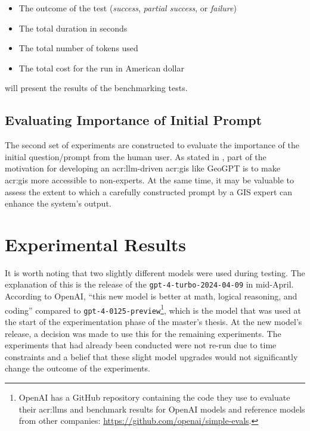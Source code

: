 \begin{itemize}
    \item The outcome of the test (\textit{success}, \textit{partial success}, or \textit{failure})
    \item The total duration in seconds
    \item The total number of tokens used
    \item The total cost for the run in American dollar
\end{itemize}

 will present the results of the benchmarking tests.

\subsection{Evaluating Importance of Initial Prompt}

The second set of experiments are constructed to evaluate the importance of the initial question/prompt from the human user. As stated in , part of the motivation for developing an \acrshort{acr:llm}-driven \acrshort{acr:gis} like GeoGPT is to make \acrshort{acr:gis} more accessible to non-experts. At the same time, it may be valuable to assess the extent to which a carefully constructed prompt by a GIS expert can enhance the system's output.


\section{Experimental Results}
\label{sec:experimental-results}

It is worth noting that two slightly different models were used during testing. The explanation of this is the release of the \texttt{gpt-4-turbo-2024-04-09} in mid-April. According to OpenAI, \enquote{this new model is better at math, logical reasoning, and coding} compared to \texttt{gpt-4-0125-preview}\footnote{OpenAI has a GitHub repository containing the code they use to evaluate their \glspl{acr:llm} and benchmark results for OpenAI models and reference models from other companies: \url{https://github.com/openai/simple-evals}.}, which is the model that was used at the start of the experimentation phase of the master's thesis. At the new model's release, a decision was made to use this for the remaining experiments. The experiments that had already been conducted were not re-run due to time constraints and a belief that these slight model upgrades would not significantly change the outcome of the experiments.

